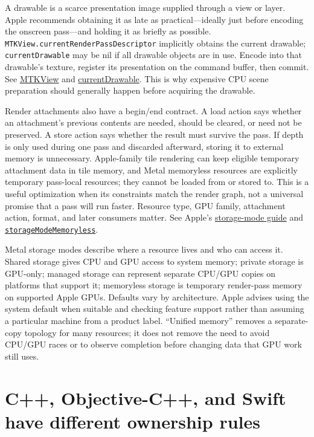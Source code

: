 A drawable is a scarce presentation image supplied through a view or layer. Apple recommends obtaining it as late as practical---ideally just before encoding the onscreen pass---and holding it as briefly as possible. \texttt{MTKView.currentRenderPassDescriptor} implicitly obtains the current drawable; \texttt{currentDrawable} may be nil if all drawable objects are in use. Encode into that drawable's texture, register its presentation on the command buffer, then commit. See \href{https://developer.apple.com/documentation/metalkit/mtkview/}{MTKView} and \href{https://developer.apple.com/documentation/MetalKit/MTKView/currentDrawable}{currentDrawable}. This is why expensive CPU scene preparation should generally happen before acquiring the drawable.

Render attachments also have a begin/end contract. A load action says whether an attachment's previous contents are needed, should be cleared, or need not be preserved. A store action says whether the result must survive the pass. If depth is only used during one pass and discarded afterward, storing it to external memory is unnecessary. Apple-family tile rendering can keep eligible temporary attachment data in tile memory, and Metal memoryless resources are explicitly temporary pass-local resources; they cannot be loaded from or stored to. This is a useful optimization when its constraints match the render graph, not a universal promise that a pass will run faster. Resource type, GPU family, attachment action, format, and later consumers matter. See Apple's \href{https://developer.apple.com/documentation/metal/setting-resource-storage-modes}{storage-mode guide} and \href{https://developer.apple.com/documentation/metal/mtlresourceoptions/storagemodememoryless}{\texttt{storageModeMemoryless}}.

Metal storage modes describe where a resource lives and who can access it. Shared storage gives CPU and GPU access to system memory; private storage is GPU-only; managed storage can represent separate CPU/GPU copies on platforms that support it; memoryless storage is temporary render-pass memory on supported Apple GPUs. Defaults vary by architecture. Apple advises using the system default when suitable and checking feature support rather than assuming a particular machine from a product label. ``Unified memory'' removes a separate-copy topology for many resources; it does not remove the need to avoid CPU/GPU races or to observe completion before changing data that GPU work still uses.

\section{C++, Objective-C++, and Swift have different ownership rules}\label{01-foundations-i-ch011-c-objective-c-and-swift-have-different-ownership-rules}

